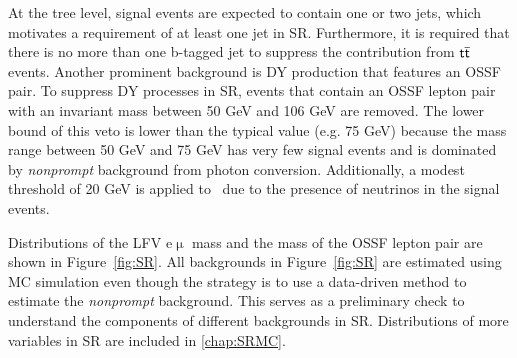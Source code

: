 At the tree level, signal events are expected to contain one or two jets, which motivates a requirement of at least one jet in \ac{SR}. Furthermore, it is required that there is no more than one b-tagged jet to suppress the contribution from $\textsf{t}\overline{\textsf{t}}$ events. Another prominent background is \ac{DY} production that features an \ac{OSSF} pair. To suppress \ac{DY} processes in \ac{SR}, events that contain an \ac{OSSF} lepton pair with an invariant mass between 50 GeV and 106 GeV are removed. The lower bound of this veto is lower than the typical value (e.g. 75 GeV) because the mass range between 50 GeV and 75 GeV has very few signal events and is dominated by \emph{nonprompt} background from photon conversion. Additionally, a modest threshold of 20 GeV is applied to \MET~due to the presence of neutrinos in the signal events.

Distributions of the LFV e$\upmu$ mass and the mass of the \ac{OSSF} lepton pair are shown in Figure~\ref{fig:SR}. All backgrounds in Figure~\ref{fig:SR} are estimated using \ac{MC} simulation even though the strategy is to use a data-driven method to estimate the \emph{nonprompt} background. This serves as a preliminary check to understand the components of different backgrounds in \ac{SR}. Distributions of more variables in \ac{SR} are included in \autoref{chap:SRMC}.

